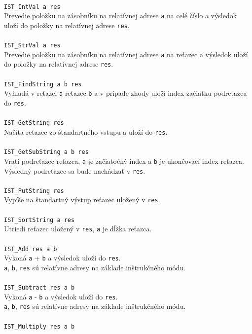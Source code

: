 \documentclass[12pt,a4paper,titlepage,final]{article}
\begin{document}
\\\texttt{IST\_IntVal a res } \\
Prevedie položku na zásobníku na relatívnej adrese \texttt{a} na celé číslo a výsledok uloží do položky na relatívnej adrese \texttt{res}.\\
\\\texttt{IST\_StrVal a res } \\
Prevedie položku na zásobníku na relatívnej adrese \texttt{a} na reťazec a výsledok uloží do položky na relatívnej adrese \texttt{res}.\\
\\\texttt{IST\_FindString a b res} \\
Vyhľadá v reťazci \texttt{a} reťazec \texttt{b} a v prípade zhody
uloží index začiatku podreťazca do \texttt{res}.\\
\\\texttt{IST\_GetString res} \\
Načíta reťazec zo štandartného vstupu a uloží do \texttt{res}. \\
\\\texttt{IST\_GetSubString a b res}\\
Vrati podreťazec reťazca, \texttt{a} je začiatočný index a \texttt{b} je
ukončovací index reťazca. Výsledný podreťazec sa bude nachádzať v \texttt{res}.\\
\\\texttt{IST\_PutString res}\\
Vypíše na štandartný výstup reťazec uložený v \texttt{res}.\\
\\\texttt{IST\_SortString a res}\\
Utriedi reťazec uložený v \texttt{res}, \texttt{a} je dĺžka reťazca.\\
\\\texttt{IST\_Add res a b}\\
Vykoná \texttt{a} + \texttt{b} a výsledok uloží do \texttt{res}.\\
\texttt{a}, \texttt{b}, \texttt{res} sú relatívne adresy na základe inštrukčného módu.\\
\\\texttt{IST\_Subtract res a b}\\
Vykoná \texttt{a} - \texttt{b} a výsledok uloží do \texttt{res}.\\
\texttt{a}, \texttt{b}, \texttt{res} sú relatívne adresy na základe inštrukčného módu.\\
\\\texttt{IST\_Multiply res a b}\\
\end{document}
